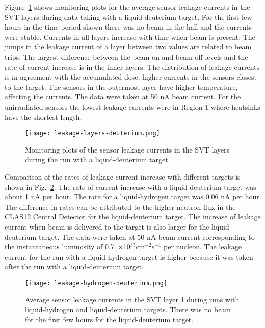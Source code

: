 Figure~\ref{fig:leakage-layers-deuterium} shows monitoring plots for the average sensor leakage currents in the SVT layers during data-taking with a liquid-deuterium target. For the first few hours in the time period shown there was no beam in the hall and the currents were stable. Currents in all layers increase with time when beam is present. The jumps in the leakage current of a layer between two values are related to beam trips. The largest difference between the beam-on and beam-off levels and the rate of current increase is in the inner layers. The distribution of leakage currents is in agreement with the accumulated dose, higher currents in the sensors closest to the target. The sensors in the outermost layer have higher temperature, affecting the currents. The data were taken at 50 nA beam current. For the unirradiated sensors the lowest leakage currents were in Region 1 where heatsinks have the shortest length.

\begin{figure}[hbt] 
\centering 
\texttt{[image: leakage-layers-deuterium.png]}
\caption{Monitoring plots of the sensor leakage currents in the SVT layers during the run with a liquid-deuterium target.}
\label{fig:leakage-layers-deuterium}
\end{figure}

Comparison of the rates of leakage current increase with different targets is shown in Fig.~\ref{fig:leakage-hydrogen-deuterium}. The rate of current increase with a liquid-deuterium target was about 1 nA per hour. The rate for a liquid-hydrogen target was 0.06 nA per hour. The difference in rates can be attributed to the higher neutron flux in the CLAS12 Central Detector for the liquid-deuterium target. The increase of leakage current when beam is delivered to the target is also larger for the liquid-deuterium target. The data were taken at 50 nA beam current corresponding to the instantaneous luminosity of 0.7~$\times$10$^{35}$cm$^{-2}$s$^{-1}$ per nucleon. The leakage current for the run with a liquid-hydrogen target is higher because it was taken after the run with a liquid-deuterium target.

\begin{figure}[hbt] 
\centering 
\texttt{[image: leakage-hydrogen-deuterium.png]}
\caption{Average sensor leakage currents in the SVT layer 1 during runs with liquid-hydrogen and liquid-deuterium targets. There was no beam for the first few hours for the liquid-deuterium target.}
\label{fig:leakage-hydrogen-deuterium}
\end{figure}

